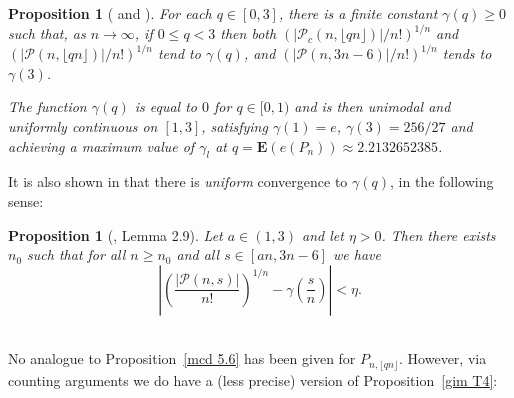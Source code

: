 \documentclass{article}
\newtheorem{Proposition}[Theorem]{Proposition}
\newtheorem{Proof of Theorem}{Proof of Theorem}
\begin{document}
\begin{Proposition}[\cite{ger} and \cite{gim}] \label{ger T2.1}
For each $q \in [0,3]$,
there is a finite constant $\gamma(q) \geq 0$ such that, as $n \to \infty$,
if $0 \leq q < 3$ then both 
$(|\mathcal{P}_{c}(n, \lfloor qn \rfloor)|/n!)^{1/n}$ and $(|\mathcal{P} (n, \lfloor qn \rfloor)|/n!)^{1/n}$
tend to $\gamma(q)$,
and $(|\mathcal{P}(n,3n-6)|/n!)^{1/n}$ tends to $\gamma(3)$.

The function $\gamma(q)$ is equal to $0$ for $q \in [0,1)$
and is then unimodal and uniformly continuous on $[1,3]$,
satisfying
$\gamma(1) = e$, $\gamma(3) = 256/27$
and achieving a maximum value of $\gamma_{l}$
at $q = \mathbf{E} \left( e(P_{n}) \right) \approx 2.2132652385$. \\
\end{Proposition} 















It is also shown in \cite{ger} that there is \textit{uniform} convergence to $\gamma(q)$,
in the following sense:















\begin{Proposition} [\cite{ger}, Lemma 2.9] \label{ger L2.9} 
Let $a \in (1,3)$ and let $\eta>0$.
Then there exists $n_{0}$ such that for all $n \geq n_{0}$ and all $s \in [an,3n-6]$ we have
\begin{displaymath}
\left| \left( \frac{|\mathcal{P}(n,s)|}{n!} \right)^{1/n} - \gamma \left( \frac{s}{n} \right) \right| < \eta.
\end{displaymath} \\
\end{Proposition}
\phantom{p} 















No analogue to Proposition~\ref{mcd 5.6} has been given for $P_{n, \lfloor qn \rfloor}$.
However, via counting arguments we do have a (less precise) version of Proposition~\ref{gim T4}:
\end{document}
